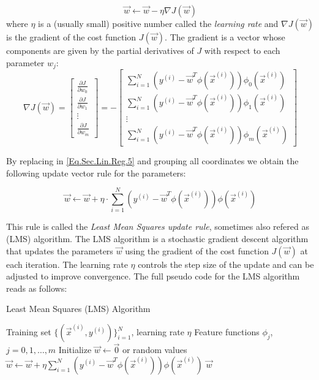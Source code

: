 \begin{equation}\label{Eq.Sec.Lin.Reg.5}
	\vec{w} \leftarrow \vec{w} - \eta \nabla J(\vec{w})
\end{equation} 
where $\eta$ is a (usually small) positive number called the \emph{learning rate} and $\nabla J(\vec{w})$ is the gradient of the cost function $J(\vec{w})$. The gradient is a vector whose components are given by the partial derivatives of $J$ with respect to each parameter $w_j$:
\begin{equation}\label{Eq.Sec.Lin.Reg.6}
	\nabla J(\vec{w}) = \begin{bmatrix}
	\frac{\partial J}{\partial w_0} \\[0.7em]
	\frac{\partial J}{\partial w_1} \\[0.7em]
	\vdots \\
	\frac{\partial J}{\partial w_m}
	\end{bmatrix} = -\begin{bmatrix} 
	\sum_{i=1}^{N} (y^{(i)} - \vec{w}^T\phi(\vec{x}^{(i)}))\phi_0(\vec{x}^{(i)}) \\[0.7em]
	\sum_{i=1}^{N} (y^{(i)} - \vec{w}^T\phi(\vec{x}^{(i)}))\phi_1(\vec{x}^{(i)}) \\[0.7em]
	\vdots \\[0.7em]
	\sum_{i=1}^{N} (y^{(i)} - \vec{w}^T\phi(\vec{x}^{(i)}))\phi_m (\vec{x}^{(i)})
	\end{bmatrix}
\end{equation}

By replacing in \cref{Eq.Sec.Lin.Reg.5} and grouping all coordinates we obtain the following update vector rule for the parameters:

\begin{equation}
	\vec{w} \leftarrow \vec{w} + \eta \cdot \sum_{i=1}^{N} (y^{(i)} - \vec{w}^T\phi(\vec{x}^{(i)}))\phi(\vec{x}^{(i)}) 
\end{equation}

This rule is called the \emph{Least Mean Squares update rule}, sometimes also refered as (LMS) algorithm. The LMS algorithm is a stochastic gradient descent algorithm that updates the parameters $\vec{w}$ using the gradient of the cost function $J(\vec{w})$ at each iteration. The learning rate $\eta$ controls the step size of the update and can be adjusted to improve convergence. The full pseudo code for the LMS algorithm reads as follows: 

\begin{algorithm}[H]
	\caption{Least Mean Squares (LMS) Algorithm}
\begin{algorithmic}[1]
	\Require Training set $\{(\vec{x}^{(i)}, y^{(i)})\}_{i=1}^N$, learning rate $\eta$
	\Require Feature functions $\phi_j$, $j=0,1,\ldots,m$
	\State Initialize $\vec{w} \leftarrow \vec{0}$ or random values
	\Repeat
		\State $\vec{w} \leftarrow \vec{w} + \eta \sum_{i=1}^N (y^{(i)} - \vec{w}^T\phi(\vec{x}^{(i)}))\phi(\vec{x}^{(i)})$
	\Return $\vec{w}$
\end{algorithmic}
\end{algorithm}



